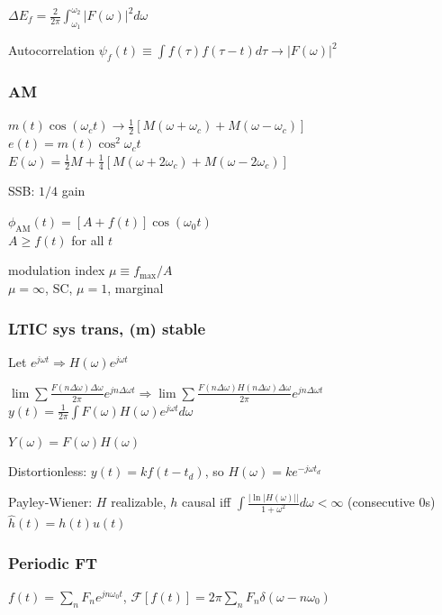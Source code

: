 \documentclass[4pt]{article}
\theoremstyle{definition}
\theoremstyle{definition}
\renewcommand{\o}{\omega}
\newcommand{\ra}{\rightarrow}
\begin{document}
\begin{landscape}
\begin{multicols}{3}
    \(\Delta E_f = \frac{2}{2\pi}\int^{\o_2}_{\o_1} |F(\o)|^2 d\o\) %

    Autocorrelation \(\psi_f(t) \equiv \int f(\tau)f(\tau-t)d\tau \ra |F(\o)|^2\)   %
\subsubsection*{AM}
    \(m(t) \cos(\o_c t) \ra \frac{1}{2}[M(\o + \o_c) + M(\o - \o_c)]\)\\     %
    \(e(t) = m(t)\cos^2 \o_c t\)  \\          %
    \(E(\o) = \frac{1}{2} M + \frac{1}{4}[M(\o + 2\o_c) + M(\o - 2\o_c)]\)

    SSB: $1/4$ gain

    \(\phi_\mathrm{AM} (t) = [A + f(t)] \cos (\omega_0 t)\)\\
    $A \geq f(t)$ for all $t$

    modulation index \(\mu\equiv f_{\text{max}}/A\)\\
    $\mu = \infty$, SC, $\mu = 1$, marginal
\subsubsection*{LTIC sys trans, (m) stable}
    Let \(e^{j\o t} \Rightarrow H(\o) e^{j\o t}\)

    \(\lim\sum \frac{F(n\Delta\o)\Delta\o}{2\pi} e^{jn\Delta\o t}\Rightarrow \lim\sum \frac{F(n\Delta\o)H(n\Delta\o)\Delta\o}{2\pi} e^{jn\Delta\o t}\)\\
    \(y(t) = \frac{1}{2\pi}\int F(\o)H(\o)e^{j\o t} d\o\)

    \(Y(\o) = F(\o) H(\o)\)

    Distortionless: $y(t) = kf(t-t_d)$,
    so $H(\o) = ke^{-j\o t_d}$          %

    Payley-Wiener: $H$ realizable, $h$ causal iff \(\int\frac{|\ln|H(\omega)||}{1+\o^2} d\o < \infty\) (consecutive 0s)\\
    \(\hat{h}(t) = h(t) u(t)\)

\subsubsection*{Periodic FT}
    \(f(t) = \sum_n F_n e^{jn\o_0 t}\), \(\mathcal{F}[f(t)] = 2\pi \sum_n F_n \delta(\omega - n\o_0)\)      %


\end{multicols}
\end{landscape}
\end{document}
